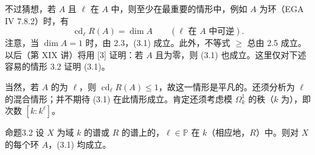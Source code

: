 不过猜想，若 $A$ 且 $\ell$ 在 $A$ 中，则至少在最重要的情形中，例如 $A$ 为环（EGA IV 7.8.2）时，有
\begin{equation}
 \operatorname{cd}_\ell R(A)=\dim A\qquad(\ell\text{ 在 }A\text{ 中可逆}).\tag{3.1}
\end{equation}
注意，当 $\dim A=1$ 时，由 2.3，(3.1) 成立。此外，不等式 $\geq$ 总由 2.5 成立。以后（第 XIX 讲）将用 [3] 证明：若 $A$ 且为零，则 (3.1) 也成立。这里仅对下述容易的情形 3.2 证明 (3.1)。

当然，若 $A$ 的为 $\ell$，则 $\operatorname{cd}_\ell R(A)\leq1$，故这一情形是平凡的。还须分析为 $\ell$ 的混合情形；并不期待 (3.1) 在此情形成立。肯定还须考虑模 $\Omega^1_k$ 的秩（$k$ 为），即次数 $[k:k^\ell]$。
\begin{SGAresult}{命题}{3.2}
设 $X$ 为域 $k$ 的谱或 $R$ 的谱上的，$\ell\in\mathbb P$ 在 $k$（相应地，$R$）中。则对 $X$ 的每个环 $A$，(3.1) 均成立。
\end{SGAresult}
